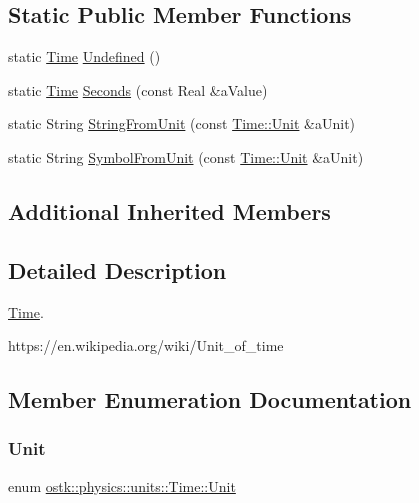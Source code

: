 \subsection*{Static Public Member Functions}
\begin{DoxyCompactItemize}
\item 
static \hyperlink{classostk_1_1physics_1_1units_1_1_time}{Time} \hyperlink{classostk_1_1physics_1_1units_1_1_time_a441dc384583635132e8e068425114ca4}{Undefined} ()
\item 
static \hyperlink{classostk_1_1physics_1_1units_1_1_time}{Time} \hyperlink{classostk_1_1physics_1_1units_1_1_time_a033cfbfb3fb4346fd073f3007512b4f6}{Seconds} (const Real \&a\+Value)
\item 
static String \hyperlink{classostk_1_1physics_1_1units_1_1_time_a598f5cb08cf2e7b5851322c1c0a31044}{String\+From\+Unit} (const \hyperlink{classostk_1_1physics_1_1units_1_1_time_aa961f0dbca7ec297e19e15e0dfa3bb4a}{Time\+::\+Unit} \&a\+Unit)
\item 
static String \hyperlink{classostk_1_1physics_1_1units_1_1_time_ae9740ed97b634fb099d1ba46e064cb0c}{Symbol\+From\+Unit} (const \hyperlink{classostk_1_1physics_1_1units_1_1_time_aa961f0dbca7ec297e19e15e0dfa3bb4a}{Time\+::\+Unit} \&a\+Unit)
\end{DoxyCompactItemize}
\subsection*{Additional Inherited Members}


\subsection{Detailed Description}
\hyperlink{classostk_1_1physics_1_1units_1_1_time}{Time}. 

https\+://en.wikipedia.\+org/wiki/\+Unit\+\_\+of\+\_\+time 

\subsection{Member Enumeration Documentation}
\mbox{\label{classostk_1_1physics_1_1units_1_1_time_aa961f0dbca7ec297e19e15e0dfa3bb4a}} 
\subsubsection{\texorpdfstring{Unit}{Unit}}
{\footnotesize\ttfamily enum \hyperlink{classostk_1_1physics_1_1units_1_1_time_aa961f0dbca7ec297e19e15e0dfa3bb4a}{ostk\+::physics\+::units\+::\+Time\+::\+Unit}\hspace{0.3cm}{\ttfamily [strong]}}

